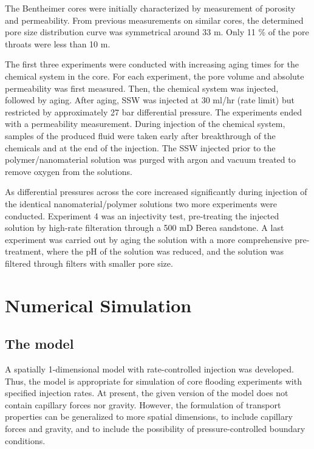 \documentclass[nanomaterials,article,submit,moreauthors,pdftex]{Definitions/mdpi}
\begin{document}
The Bentheimer cores were initially characterized by measurement of porosity and permeability. From previous measurements on similar cores, the determined pore size distribution curve was symmetrical around 33 \micro m. Only 11 \% of the pore throats were less than 10 \micro m.


The first three experiments were conducted with increasing aging times for the chemical system in the core. For each experiment, the pore volume and absolute permeability was first measured. Then, the chemical system was injected, followed by aging. After aging, SSW was injected at 30 ml/hr (rate limit) but restricted by approximately 27 bar differential pressure. The experiments ended with a permeability measurement. During injection of the chemical system, samples of the produced fluid were taken early after breakthrough of the chemicals and at the end of the injection. The SSW injected prior to the polymer/nanomaterial solution was purged with argon and vacuum treated to remove oxygen from the solutions.

As differential pressures across the core increased significantly during injection of the identical nanomaterial/polymer solutions two more experiments were conducted. Experiment 4 was an injectivity test, pre-treating the injected solution by high-rate filteration through a 500 mD Berea sandstone. A last experiment was carried out by aging the solution with a more comprehensive pre-treatment, where the pH of the solution was reduced, and the solution was filtered through filters with smaller pore size.

\section{Numerical Simulation}
\subsection{The model}
A spatially 1-dimensional model with rate-controlled injection was developed. Thus, the model is appropriate for simulation of core flooding experiments with specified injection rates. At present, the given version of the model does not contain capillary forces nor gravity. However, the formulation of transport properties can be generalized to more spatial dimensions, to include capillary forces and gravity, and to include the possibility of pressure-controlled boundary conditions. 
\end{document}

